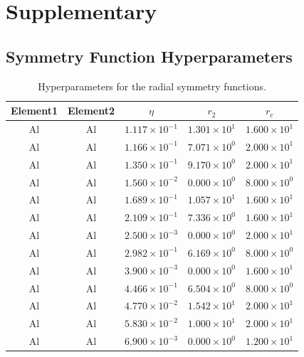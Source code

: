 \documentclass{article}
\renewcommand{\arraystretch}{1.5}
\begin{document}
\newpage
  

\newpage
\appendix
\section{Supplementary}
\subsection{Symmetry Function Hyperparameters} \label{sct:symmfunc_hyperparam}

\bgroup
\def\arraystretch{1.2}
\begin{longtable}{ccccc}
\caption{Hyperparameters for the radial symmetry functions.} \\
\hline
Element1 & Element2 & $\eta$ & $r_2$ & $r_c$ \\
\hline
\hline
Al &  Al & $1.117 \times 10^{-1}$ & $1.301 \times 10^{1}$ & $1.600 \times 10^{1}$ \\
Al &  Al & $1.166 \times 10^{-1}$ & $7.071 \times 10^{0}$ & $2.000 \times 10^{1}$ \\
Al &  Al & $1.350 \times 10^{-1}$ & $9.170 \times 10^{0}$ & $2.000 \times 10^{1}$ \\
Al &  Al & $1.560 \times 10^{-2}$ & $0.000 \times 10^{0}$ & $8.000 \times 10^{0}$ \\
Al &  Al & $1.689 \times 10^{-1}$ & $1.057 \times 10^{1}$ & $1.600 \times 10^{1}$ \\
Al &  Al & $2.109 \times 10^{-1}$ & $7.336 \times 10^{0}$ & $1.600 \times 10^{1}$ \\
Al &  Al & $2.500 \times 10^{-3}$ & $0.000 \times 10^{0}$ & $2.000 \times 10^{1}$ \\
Al &  Al & $2.982 \times 10^{-1}$ & $6.169 \times 10^{0}$ & $8.000 \times 10^{0}$ \\
Al &  Al & $3.900 \times 10^{-3}$ & $0.000 \times 10^{0}$ & $1.600 \times 10^{1}$ \\
Al &  Al & $4.466 \times 10^{-1}$ & $6.504 \times 10^{0}$ & $8.000 \times 10^{0}$ \\
Al &  Al & $4.770 \times 10^{-2}$ & $1.542 \times 10^{1}$ & $2.000 \times 10^{1}$ \\
Al &  Al & $5.830 \times 10^{-2}$ & $1.000 \times 10^{1}$ & $2.000 \times 10^{1}$ \\
Al &  Al & $6.900 \times 10^{-3}$ & $0.000 \times 10^{0}$ & $1.200 \times 10^{1}$ \\

\end{longtable}
\end{document}
